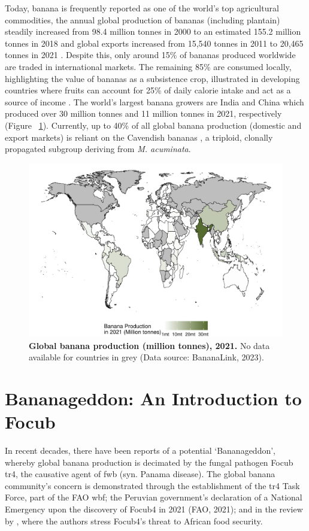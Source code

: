 Today, banana is frequently reported as one of the world’s top agricultural commodities, the annual global production of bananas (including plantain) steadily increased from 98.4 million tonnes in 2000 to an estimated 155.2 million tonnes in 2018  and global exports increased from 15,540 tonnes in 2011 to 20,465 tonnes in 2021 \parencite{FAO2022}. Despite this, only around 15\% of bananas produced worldwide are traded in international markets. The remaining 85\% are consumed locally, highlighting the value of bananas as a subsistence crop, illustrated in developing countries where fruits can account for 25\% of daily calorie intake and act as a source of income \parencite{FAO2019}. The world’s largest banana growers are India and China which produced over 30 million tonnes and 11 million tonnes in 2021, respectively \parencite{BananaLink2023} (Figure ~\ref{fig:bananaProdMap}).  Currently, up to 40\% of all global banana production (domestic and export markets) is reliant on the Cavendish bananas \parencite{Warman2018}, a triploid, clonally propagated subgroup deriving from \textit{M. acuminata}.

\begin{figure}[h!]
    \centering
    \includegraphics[width=\textwidth]{Figures/BananaProdMap.pdf}
    \caption[Global banana production, 2021]{\textbf{Global banana production (million tonnes), 2021.} No data available for countries in grey (Data source: BananaLink, 2023).}
    \label{fig:bananaProdMap}
\end{figure}

\section{Bananageddon: An Introduction to \acl{Focub}}
In recent decades, there have been reports of a potential ‘Bananageddon’, whereby global banana production is decimated by the fungal pathogen \acf{Focub} \acf{tr4}, the causative agent of \ac{fwb} (syn. Panama disease). The global banana community’s concern is demonstrated through the establishment of the \acs{tr4} Task Force, part of the \ac{FAO} \ac{wbf}; the Peruvian government’s declaration of a National Emergency upon the discovery of \ac{Focub4} in 2021 (FAO, 2021); and in the review by \textcite{Westerhoven2022}, where the authors stress \ac{Focub4}'s threat to African food security.   

